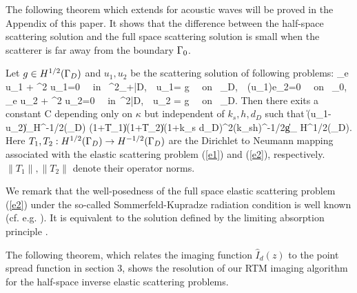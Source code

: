 \documentclass[12pt]{iopart}
\begin{document}
The following theorem which extends \cite[Theorem 4.1]{RTMhalf_aco} for acoustic waves will be proved in the Appendix of this paper. It shows that the difference between the half-space scattering solution and the full space scattering solution is small when the scatterer is far away from the boundary $\Gamma_0$.

\begin{thm}\label{thm:4.2}
Let $g\in H^{1/2}(\Gamma_D)$ and $u_1,u_2$ be the scattering solution of following problems:
	\be\label{e1}
	\Delta_e u_1 + \omega^2 u_1=0 \ \ \mbox{\rm in } \R^2_+\bks \bar{D},\ \  u_1= g \ \ \mbox{\rm on } \Ga_D,\ \ \sigma(u_1)e_2=0 \ \ \mbox{\rm on } \Ga_0,\\
	\label{e2}
	\Delta_e u_2 + \omega^2 u_2=0 \ \ \mbox{\rm in }\R^2\bks \bar{D},\ \ u_2 = g \ \ \mbox{\rm on } \Ga_D.
	\ee
	Then there exits a constant C depending only on $\kappa$ but independent of $k_s, h,d_D$ such that
	\ben\hskip-2cm
	\|\sigma(u_1-u_2)\nu\|_{H^{-1/2}(\Gamma_D)}
	\le{}(1+\|T_1\|)(1+\|T_2\|)(1+k_s d_D)^2(k_sh)^{-1/2}\|g\|_{ H^{1/2}(\Ga_D)}.
	\een
Here $T_1, T_2:H^{1/2}(\Gamma_D)\to H^{-1/2}(\Gamma_D)$ are the Dirichlet to Neumann mapping associated with the elastic scattering problem (\ref{e1}) and (\ref{e2}), respectively. $\|T_1\|, \|T_2\|$ denote their operator norms.
\end{thm}

We remark that the well-posedness of the full space elastic scattering problem (\ref{e2}) under the so-called Sommerfeld-Kupradze radiation condition is well known (cf. e.g. \cite{ku63}). It is equivalent to the solution defined by the limiting absorption principle \cite{leis, cxz2016}.

The following theorem, which relates the imaging function $\hat I_d(z)$ to the point spread function in section 3, shows the resolution of our RTM imaging algorithm for the half-space inverse elastic scattering problems.
\end{document}
